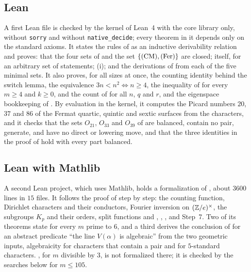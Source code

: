 \subsection*{Lean}
A first Lean file is checked by the kernel of Lean~4 with the core library
only, without \texttt{sorry} and without
\texttt{native\_decide}; every theorem in it depends only on the standard
axioms. It states the rules of  as an inductive derivability
relation and proves: that the four sets of  and the set
$\{\textup{(CM)},\textup{(Fer)}\}$ are closed;  itself, for an arbitrary set
of statements; (i); and the derivations of \HC{} from each of
the five minimal sets. It also proves, for all sizes at once, the counting
identity behind the switch lemma, the equivalence $3n<n^{2}\iff n\ge4$,
the inequality of  for every $m\ge4$ and $k\ge0$, and the
count of  for all $n$, $q$ and $r$, and the eigenspace
bookkeeping of . By evaluation in the kernel, it
computes the Picard numbers $20$, $37$ and $86$ of the Fermat quartic,
quintic and sextic surfaces from the characters, and it checks that the sets
$O_{21}$, $O_{33}$ and $O_{39}$ of  are balanced,
contain no pair, generate, and have no direct or lowering move, and that the
three identities in the proof of  hold with every part
balanced.

\subsection*{Lean with Mathlib}
A second Lean project, which uses Mathlib, holds a formalization of
, about $3600$ lines in $15$ files.
It follows the proof of  step by step: the counting
function, Dirichlet characters and their conductors, Fourier inversion on
$(\mathbb{Z}/e)^{\times}$, the subgroups $K_{p}$ and their orders, split functions
and , ,
, and Step~7. Two of its theorems
state  for every $m$ prime to $6$, and a third derives the conclusion of  for
an abstract predicate ``the line $V(\alpha)$ is algebraic'' from the two
geometric inputs, algebraicity for characters that contain a pair and for
$5$-standard characters. , for $m$ divisible by $3$, is not
formalized there; it is checked by the searches below for $m\le105$.

